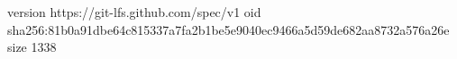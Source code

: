 version https://git-lfs.github.com/spec/v1
oid sha256:81b0a91dbe64c815337a7fa2b1be5e9040ec9466a5d59de682aa8732a576a26e
size 1338
